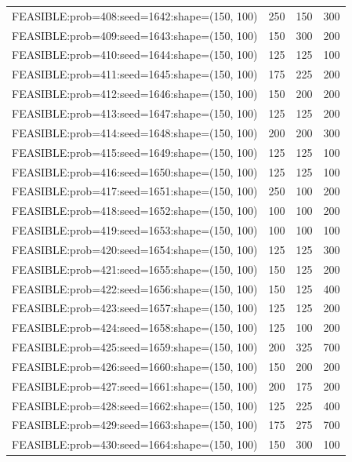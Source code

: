 \begin{longtable}{lccc}
FEASIBLE:prob=408:seed=1642:shape=(150, 100) &      250 &   150 &    300 \\
FEASIBLE:prob=409:seed=1643:shape=(150, 100) &      150 &   300 &    200 \\
FEASIBLE:prob=410:seed=1644:shape=(150, 100) &      125 &   125 &    100 \\
FEASIBLE:prob=411:seed=1645:shape=(150, 100) &      175 &   225 &    200 \\
FEASIBLE:prob=412:seed=1646:shape=(150, 100) &      150 &   200 &    200 \\
FEASIBLE:prob=413:seed=1647:shape=(150, 100) &      125 &   125 &    200 \\
FEASIBLE:prob=414:seed=1648:shape=(150, 100) &      200 &   200 &    300 \\
FEASIBLE:prob=415:seed=1649:shape=(150, 100) &      125 &   125 &    100 \\
FEASIBLE:prob=416:seed=1650:shape=(150, 100) &      125 &   125 &    100 \\
FEASIBLE:prob=417:seed=1651:shape=(150, 100) &      250 &   100 &    200 \\
FEASIBLE:prob=418:seed=1652:shape=(150, 100) &      100 &   100 &    200 \\
FEASIBLE:prob=419:seed=1653:shape=(150, 100) &      100 &   100 &    100 \\
FEASIBLE:prob=420:seed=1654:shape=(150, 100) &      125 &   125 &    300 \\
FEASIBLE:prob=421:seed=1655:shape=(150, 100) &      150 &   125 &    200 \\
FEASIBLE:prob=422:seed=1656:shape=(150, 100) &      150 &   125 &    400 \\
FEASIBLE:prob=423:seed=1657:shape=(150, 100) &      125 &   125 &    200 \\
FEASIBLE:prob=424:seed=1658:shape=(150, 100) &      125 &   100 &    200 \\
FEASIBLE:prob=425:seed=1659:shape=(150, 100) &      200 &   325 &    700 \\
FEASIBLE:prob=426:seed=1660:shape=(150, 100) &      150 &   200 &    200 \\
FEASIBLE:prob=427:seed=1661:shape=(150, 100) &      200 &   175 &    200 \\
FEASIBLE:prob=428:seed=1662:shape=(150, 100) &      125 &   225 &    400 \\
FEASIBLE:prob=429:seed=1663:shape=(150, 100) &      175 &   275 &    700 \\
FEASIBLE:prob=430:seed=1664:shape=(150, 100) &      150 &   300 &    100 \\

\end{longtable}
